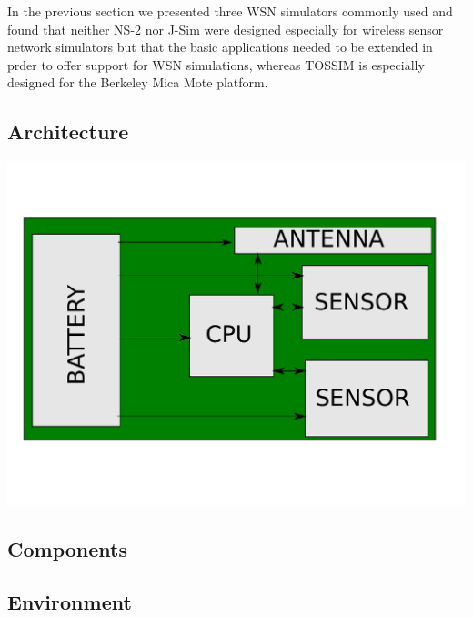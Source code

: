 In the previous section we presented three WSN simulators commonly used and 
found that neither NS-2 nor J-Sim were designed especially for wireless 
sensor network simulators but that the basic applications needed to be extended
in prder to offer support for WSN simulations, whereas TOSSIM is especially designed
for the Berkeley Mica Mote platform.
\subsection{Architecture}
\begin{center}
	\includegraphics[scale=0.6]{img/board.pdf}
\end{center}
\subsection{Components}
\subsection{Environment}
